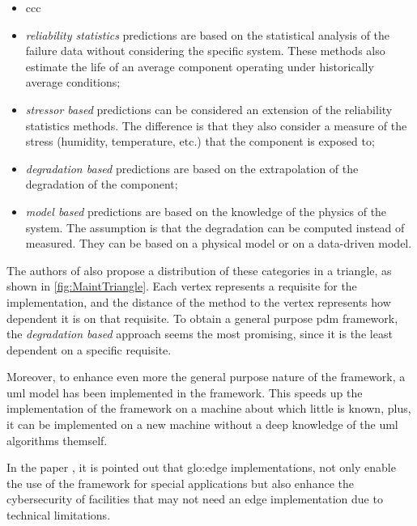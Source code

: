 \begin{itemize}
    \item ccc%
    \item \emph{reliability statistics} predictions are based on the statistical analysis of the failure data without considering the specific system. These methods also estimate the life
    of an average component operating under historically average conditions;
    \item \emph{stressor based} predictions can be considered an extension of the reliability statistics methods. The difference is that they also consider a measure of the stress (humidity, temperature, etc.) that the component is exposed to;
    \item \emph{degradation based} predictions are based on the extrapolation of the degradation of the component;
    \item \emph{model based} predictions are based on the knowledge of the physics of the system. The assumption is that the degradation can be computed instead of measured. They can be based on a physical model or on a data-driven model.
\end{itemize}


The authors of \cite{Maintenance_cat} also propose a distribution of these categories in a triangle, as shown in \autoref{fig:MaintTriangle}. Each vertex represents a requisite for the implementation, and the distance of the method to the vertex represents how dependent it is on that requisite. To obtain a general purpose \gls{pdm} framework, the \emph{degradation based} approach seems the most promising, since it is the least dependent on a specific requisite.

Moreover, to enhance even more the general purpose nature of the framework, a \gls{uml} model has been implemented in the framework. This speeds up the implementation of the framework on a machine about which little is known, plus, it can be implemented on a new machine without a deep knowledge of the \gls{uml} algorithms themself.

In the paper \cite{GridPredictMaintenance}, it is pointed out that \gls{glo:edge} implementations, not only enable the use of the framework for special applications but also enhance the cybersecurity of facilities that may not need an edge implementation due to technical limitations.